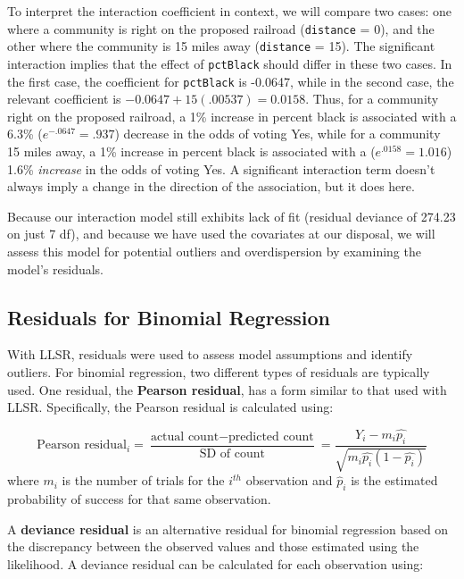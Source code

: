 \documentclass[
]{krantz}
\begin{document}
To interpret the interaction coefficient in context, we will compare two cases: one where a community is right on the proposed railroad (\texttt{distance} = 0), and the other where the community is 15 miles away (\texttt{distance} = 15). The significant interaction implies that the effect of \texttt{pctBlack} should differ in these two cases. In the first case, the coefficient for \texttt{pctBlack} is -0.0647, while in the second case, the relevant coefficient is \(-0.0647+15(.00537) = 0.0158\). Thus, for a community right on the proposed railroad, a 1\% increase in percent black is associated with a 6.3\% (\(e^{-.0647}=.937\)) decrease in the odds of voting Yes, while for a community 15 miles away, a 1\% increase in percent black is associated with a (\(e^{.0158}=1.016\)) 1.6\% \emph{increase} in the odds of voting Yes. A significant interaction term doesn't always imply a change in the direction of the association, but it does here.

Because our interaction model still exhibits lack of fit (residual deviance of 274.23 on just 7 df), and because we have used the covariates at our disposal, we will assess this model for potential outliers and overdispersion by examining the model's residuals.

\hypertarget{residuals-for-binomial-regression}{%
\subsection{Residuals for Binomial Regression}\label{residuals-for-binomial-regression}}

With LLSR, residuals were used to assess model assumptions and identify outliers. For binomial regression, two different types of residuals are typically used. One residual, the \textbf{Pearson residual},  has a form similar to that used with LLSR. Specifically, the Pearson residual is calculated using:

\begin{equation*}
\textrm{Pearson residual}_i = \frac{\textrm{actual count}-\textrm{predicted count}}{\textrm{SD of count}} =
\frac{Y_i-m_i\hat{p_i}}{\sqrt{m_i\hat{p_i}(1-\hat{p_i})}}
\end{equation*}
where \(m_i\) is the number of trials for the \(i^{th}\) observation and \(\hat{p}_i\) is the estimated probability of success for that same observation.

A \textbf{deviance residual}  is an alternative residual for binomial regression based on the discrepancy between the observed values and those estimated using the likelihood.
A deviance residual can be calculated for each observation using:
\end{document}
